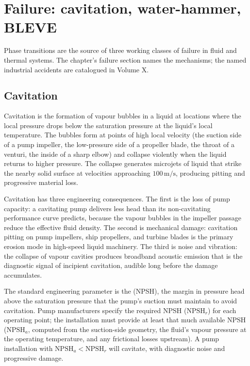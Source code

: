 \section{Failure: cavitation, water-hammer, BLEVE}

Phase transitions are the source of three working classes of failure
in fluid and thermal systems. The chapter's failure section names the
mechanisms; the named industrial accidents are catalogued in Volume X.

\subsection{Cavitation}

Cavitation is the formation of vapour bubbles in a liquid at locations
where the local pressure drops below the saturation pressure at the
liquid's local temperature. The bubbles form at points of high local
velocity (the suction side of a pump impeller, the low-pressure side
of a propeller blade, the throat of a venturi, the inside of a sharp
elbow) and collapse violently when the liquid returns to higher
pressure. The collapse generates microjets of liquid that strike the
nearby solid surface at velocities approaching $100\,\text{m}/\text{s}$,
producing pitting and progressive material loss.

Cavitation has three engineering consequences. The first is the loss
of pump capacity: a cavitating pump delivers less head than its
non-cavitating performance curve predicts, because the vapour bubbles
in the impeller passage reduce the effective fluid density. The second
is mechanical damage: cavitation pitting on pump impellers, ship
propellers, and turbine blades is the primary erosion mode in
high-speed liquid machinery. The third is noise and vibration: the
collapse of vapour cavities produces broadband acoustic emission that
is the diagnostic signal of incipient cavitation, audible long before
the damage accumulates.

The standard engineering parameter is the  (NPSH), the margin in pressure head above the saturation
pressure that the pump's suction must maintain to avoid cavitation.
Pump manufacturers specify the required NPSH ($\text{NPSH}_r$) for
each operating point; the installation must provide at least that much
available NPSH ($\text{NPSH}_a$, computed from the suction-side
geometry, the fluid's vapour pressure at the operating temperature,
and any frictional losses upstream). A pump installation with
$\text{NPSH}_a < \text{NPSH}_r$ will cavitate, with diagnostic noise
and progressive damage.

